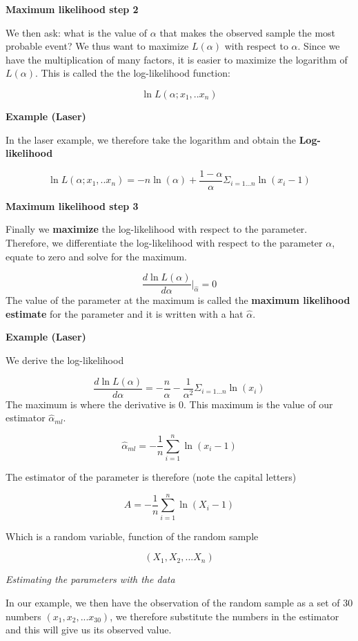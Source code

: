 \documentclass[
]{book}
\begin{document}
\textbf{Maximum likelihood step 2}

We then ask: what is the value of \(\alpha\) that makes the observed sample the most probable event? We thus want to maximize \(L(\alpha)\) with respect to \(\alpha\). Since we have the multiplication of many factors, it is easier to maximize the logarithm of \(L(\alpha)\). This is called the the log-likelihood function:

\[\ln L(\alpha;x_1,..x_n)\]

\textbf{Example (Laser)}

In the laser example, we therefore take the logarithm and obtain the \textbf{Log-likelihood}

\[\ln L(\alpha;x_1,..x_n)= -n \ln(\alpha) + {\frac{1-\alpha}{\alpha}} \Sigma_{i=1...n} \ln (x_i-1)\]

\textbf{Maximum likelihood step 3}

Finally we \textbf{maximize} the log-likelihood with respect to the parameter. Therefore, we differentiate the log-likelihood with respect to the parameter \(\alpha\), equate to zero and solve for the maximum.

\[\frac{d \ln L(\alpha)}{d \alpha} \big|_{\hat{\alpha}}=0 \]
The value of the parameter at the maximum is called the \textbf{maximum likelihood estimate} for the parameter and it is written with a hat \(\hat{\alpha}\).

\textbf{Example (Laser)}

We derive the log-likelihood

\[\frac{d \ln L(\alpha)}{d \alpha}= -\frac{n}{\alpha} - \frac{1}{\alpha^2}  \Sigma_{i=1...n} \ln (x_i)\]
The maximum is where the derivative is \(0\). This maximum is the value of our estimator \(\hat{\alpha}_{ml}\).

\[\hat{\alpha}_{ml}=-\frac{1}{n}\sum_{i=1}^n \ln (x_i-1)\]

The estimator of the parameter is therefore (note the capital letters)

\[A=-\frac{1}{n}\sum_{i=1}^n \ln (X_i-1)\]

Which is a random variable, function of the random sample

\[(X_1, X_2, ... X_n)\]

\emph{Estimating the parameters with the data}

In our example, we then have the observation of the random sample as a set of 30 numbers \((x_1, x_2, ...x_{30})\), we therefore substitute the numbers in the estimator and this will give us its observed value.
\end{document}
